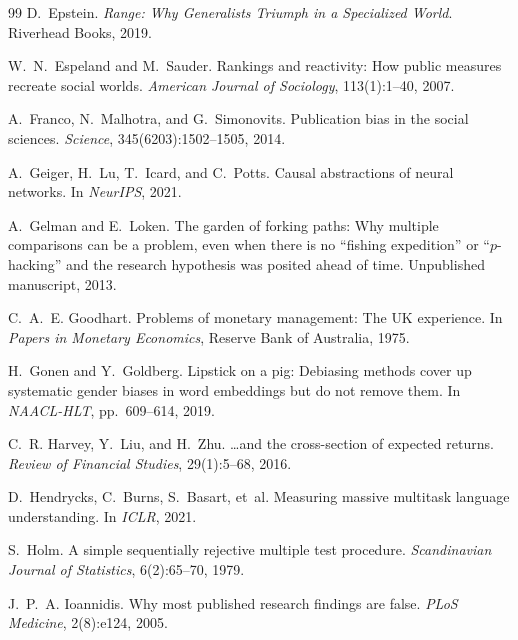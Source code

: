 \documentclass{article}
\begin{document}
\begin{thebibliography}{99}
D.~Epstein.
\newblock \emph{Range: Why Generalists Triumph in a Specialized World}.
\newblock Riverhead Books, 2019.

W.~N.~Espeland and M.~Sauder.
\newblock Rankings and reactivity: How public measures recreate social worlds.
\newblock \emph{American Journal of Sociology}, 113(1):1--40, 2007.

A.~Franco, N.~Malhotra, and G.~Simonovits.
\newblock Publication bias in the social sciences.
\newblock \emph{Science}, 345(6203):1502--1505, 2014.

A.~Geiger, H.~Lu, T.~Icard, and C.~Potts.
\newblock Causal abstractions of neural networks.
\newblock In \emph{NeurIPS}, 2021.

A.~Gelman and E.~Loken.
\newblock The garden of forking paths: Why multiple comparisons can be a problem, even when there is no ``fishing expedition'' or ``$p$-hacking'' and the research hypothesis was posited ahead of time.
\newblock Unpublished manuscript, 2013.

C.~A.~E. Goodhart.
\newblock Problems of monetary management: The {UK} experience.
\newblock In \emph{Papers in Monetary Economics}, Reserve Bank of Australia, 1975.

H.~Gonen and Y.~Goldberg.
\newblock Lipstick on a pig: {Debiasing} methods cover up systematic gender biases in word embeddings but do not remove them.
\newblock In \emph{NAACL-HLT}, pp.\ 609--614, 2019.

C.~R. Harvey, Y.~Liu, and H.~Zhu.
\newblock \ldots and the cross-section of expected returns.
\newblock \emph{Review of Financial Studies}, 29(1):5--68, 2016.

D.~Hendrycks, C.~Burns, S.~Basart, et~al.
\newblock Measuring massive multitask language understanding.
\newblock In \emph{ICLR}, 2021.

S.~Holm.
\newblock A simple sequentially rejective multiple test procedure.
\newblock \emph{Scandinavian Journal of Statistics}, 6(2):65--70, 1979.

J.~P.~A. Ioannidis.
\newblock Why most published research findings are false.
\newblock \emph{PLoS Medicine}, 2(8):e124, 2005.


\end{thebibliography}
\end{document}

